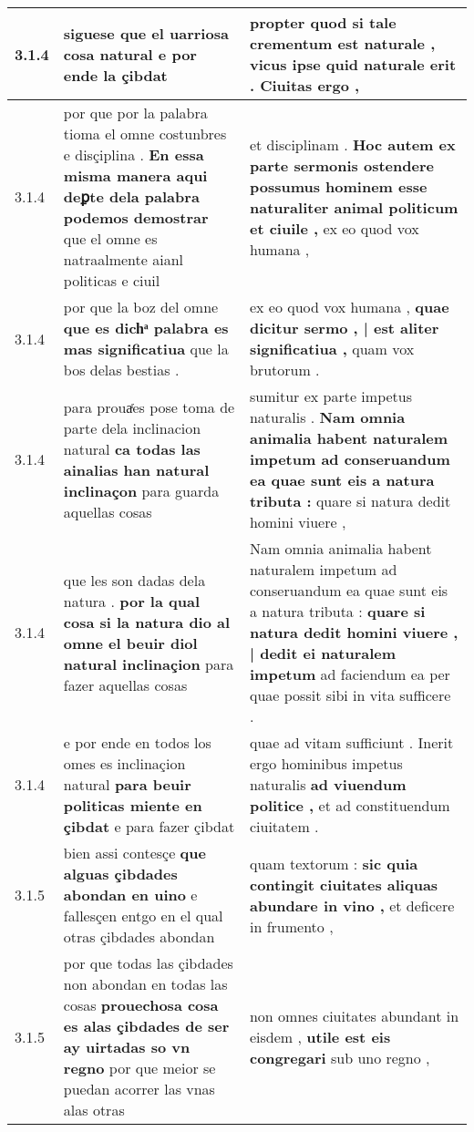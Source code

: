 \begin{tabular}{|p{1cm}|p{6.5cm}|p{6.5cm}|}
3.1.4 & siguese \textbf{ que el uarriosa cosa natural } e por ende la çibdat & propter quod si tale crementum est naturale , \textbf{ vicus ipse quid naturale erit . } Ciuitas ergo , \\\hline
3.1.4 & por que por la palabra tioma el omne costunbres e disçiplina . \textbf{ En essa misma manera aqui deꝑte dela palabra podemos demostrar } que el omne es natraalmente aianl politicas e ciuil & et disciplinam . \textbf{ Hoc autem ex parte sermonis ostendere possumus hominem esse naturaliter animal politicum et ciuile , } ex eo quod vox humana , \\\hline
3.1.4 & por que la boz del omne \textbf{ que es dichͣ palabra es mas significatiua } que la bos delas bestias . & ex eo quod vox humana , \textbf{ quae dicitur sermo , | est aliter significatiua , } quam vox brutorum . \\\hline
3.1.4 & para prouaͬes pose toma de parte dela inclinacion natural \textbf{ ca todas las ainalias han natural inclinaçon } para guarda aquellas cosas & sumitur ex parte impetus naturalis . \textbf{ Nam omnia animalia habent naturalem impetum ad conseruandum ea quae sunt eis a natura tributa : } quare si natura dedit homini viuere , \\\hline
3.1.4 & que les son dadas dela natura . \textbf{ por la qual cosa si la natura dio al omne el beuir diol natural inclinaçion } para fazer aquellas cosas & Nam omnia animalia habent naturalem impetum ad conseruandum ea quae sunt eis a natura tributa : \textbf{ quare si natura dedit homini viuere , | dedit ei naturalem impetum } ad faciendum ea per quae possit sibi in vita sufficere . \\\hline
3.1.4 & e por ende en todos los omes es inclinaçion natural \textbf{ para beuir politicas miente en çibdat } e para fazer çibdat & quae ad vitam sufficiunt . Inerit ergo hominibus impetus naturalis \textbf{ ad viuendum politice , } et ad constituendum ciuitatem . \\\hline
3.1.5 & bien assi contesçe \textbf{ que alguas çibdades abondan en uino } e fallesçen entgo en el qual otras çibdades abondan & quam textorum : \textbf{ sic quia contingit ciuitates aliquas abundare in vino , } et deficere in frumento , \\\hline
3.1.5 & por que todas las çibdades non abondan en todas las cosas \textbf{ prouechosa cosa es alas çibdades de ser ay uirtadas so vn regno } por que meior se puedan acorrer las vnas alas otras & non omnes ciuitates abundant in eisdem , \textbf{ utile est eis congregari } sub uno regno , \\\hline

\end{tabular}
